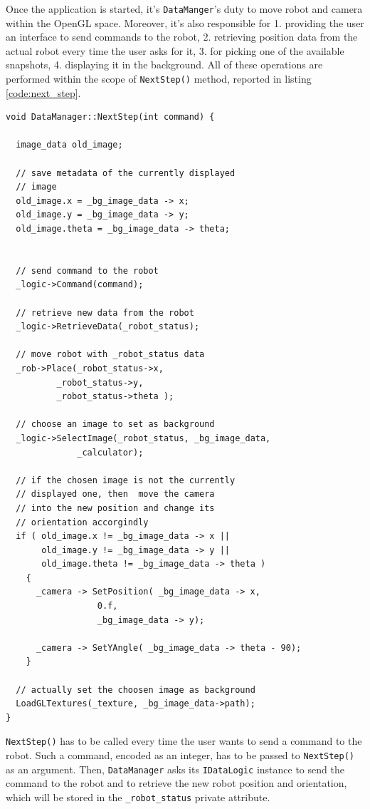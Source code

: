 %
Once the application is started, it's \texttt{DataManger}'s duty 
to move robot and camera within the OpenGL space. Moreover, 
it's also responsible for 1. providing the user an interface 
to send commands to the robot, 2. retrieving position 
data from the actual robot every time the user asks 
for it, 3. for picking one of the available snapshots, 
4. displaying it in the background. 
%
All of these operations are performed within the 
scope of \texttt{NextStep()} method, reported in 
listing \ref{code:next_step}.
%
\begin{lstlisting}[caption={The \texttt{DataManager::NextStep()} method}, label={code:next_step}, frame=trBL]
void DataManager::NextStep(int command) {

  image_data old_image;

  // save metadata of the currently displayed 
  // image
  old_image.x = _bg_image_data -> x;
  old_image.y = _bg_image_data -> y;
  old_image.theta = _bg_image_data -> theta;


  // send command to the robot
  _logic->Command(command);

  // retrieve new data from the robot
  _logic->RetrieveData(_robot_status);

  // move robot with _robot_status data
  _rob->Place(_robot_status->x,
	      _robot_status->y,
	      _robot_status->theta ); 

  // choose an image to set as background
  _logic->SelectImage(_robot_status, _bg_image_data,
		      _calculator);

  // if the chosen image is not the currently
  // displayed one, then  move the camera
  // into the new position and change its 
  // orientation accorgindly
  if ( old_image.x != _bg_image_data -> x ||
       old_image.y != _bg_image_data -> y ||
       old_image.theta != _bg_image_data -> theta )
    {
      _camera -> SetPosition( _bg_image_data -> x,
			      0.f,
			      _bg_image_data -> y);
      
      _camera -> SetYAngle( _bg_image_data -> theta - 90);
    }

  // actually set the choosen image as background
  LoadGLTextures(_texture, _bg_image_data->path);
}
\end{lstlisting}
%
\texttt{NextStep()} has to be called every time 
the user wants to send a command to the robot. 
%
Such a command, encoded as an integer, has to be passed to 
\texttt{NextStep()} as an argument.
%
Then, \texttt{DataManager} asks its \texttt{IDataLogic} 
instance to send the command to the robot and to 
retrieve the new robot position and orientation, which will be 
stored in the \texttt{\_robot\_status} private attribute.
%

